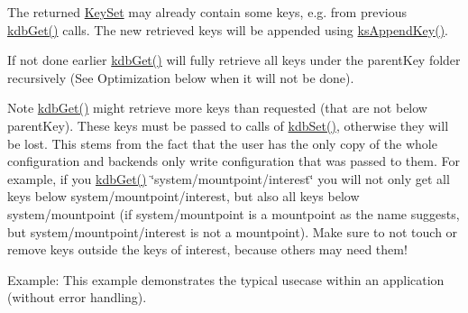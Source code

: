The {\ttfamily returned} \mbox{\hyperlink{classkdb_1_1KeySet}{Key\+Set}} may already contain some keys, e.\+g. from previous \mbox{\hyperlink{group__kdb_ga28e385fd9cb7ccfe0b2f1ed2f62453a1}{kdb\+Get()}} calls. The new retrieved keys will be appended using \mbox{\hyperlink{group__keyset_gaa5a1d467a4d71041edce68ea7748ce45}{ks\+Append\+Key()}}.

If not done earlier \mbox{\hyperlink{group__kdb_ga28e385fd9cb7ccfe0b2f1ed2f62453a1}{kdb\+Get()}} will fully retrieve all keys under the {\ttfamily parent\+Key} folder recursively (See Optimization below when it will not be done).

\begin{DoxyNote}{Note}
\mbox{\hyperlink{group__kdb_ga28e385fd9cb7ccfe0b2f1ed2f62453a1}{kdb\+Get()}} might retrieve more keys than requested (that are not below parent\+Key). These keys must be passed to calls of \mbox{\hyperlink{group__kdb_ga11436b058408f83d303ca5e996832bcf}{kdb\+Set()}}, otherwise they will be lost. This stems from the fact that the user has the only copy of the whole configuration and backends only write configuration that was passed to them. For example, if you \mbox{\hyperlink{group__kdb_ga28e385fd9cb7ccfe0b2f1ed2f62453a1}{kdb\+Get()}} \char`\"{}system/mountpoint/interest\char`\"{} you will not only get all keys below system/mountpoint/interest, but also all keys below system/mountpoint (if system/mountpoint is a mountpoint as the name suggests, but system/mountpoint/interest is not a mountpoint). Make sure to not touch or remove keys outside the keys of interest, because others may need them!
\end{DoxyNote}
\begin{DoxyParagraph}{Example\+:}
This example demonstrates the typical usecase within an application (without error handling).
\end{DoxyParagraph}

